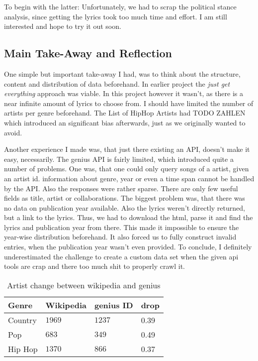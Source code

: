 \documentclass[11pt,a4paper]{article}
\begin{document}
To begin with the latter: Unfortunately, we had to scrap the political stance analysis, since getting the lyrics took too much time and effort. I am still interested and hope to try it out soon.

\subsection{Main Take-Away and Reflection}
One simple but important take-away I had, was to think about the structure, content and distribution of data beforehand. In earlier project the \emph{just get everything} approach was viable. In this project however it wasn't, as there is a near infinite amount of lyrics to choose from. I should have limited the number of artists per genre beforehand. The List of HipHop Artists had TODO ZAHLEN which introduced an significant bias afterwards, just as we originally wanted to avoid. 

Another experience I made was, that just there existing an API, doesn't make it easy, necessarily. The genius API is fairly limited, %
which introduced quite a number of problems. One was, that one could only query songs of a artist, given an artist id. information about genre, year or even a time span cannot be handled by the API. 
Also the responses were rather sparse. There are only few useful fields as title, artist or collaborations. The biggest problem was, that there was no data on publication year available. Also the lyrics weren't directly returned, but a link to the lyrics. Thus, we had to download the html, parse it and find the lyrics and publication year from there. 
This made it impossible to ensure the year-wise distribution beforehand. It also forced us to fully construct invalid entries, when the publication year wasn't even provided. 
To conclude, I definitely underestimated the challenge to create a custom data set when the given api tools are crap and there too much shit to properly crawl it.







\begin{table}
\begin{tabular}{llll}
\hline
Genre & Wikipedia & genius ID & drop \\ \hline 
Country & $1969$ & $1237$ & 0.39 \\
Pop & $683$ & $349$ & 0.49 \\
Hip Hop & $1370$ & $866$ & 0.37 \\ \hline
\end{tabular}
\caption{Artist change between wikipedia and genius}
\label{tab:scrape:idscomp}
\end{table}
\end{document}
